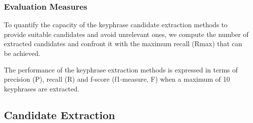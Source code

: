     \subsubsection{Evaluation Measures}
    \label{subsubsec:keyphrase_extraction_evaluation_measures}
      To quantify the capacity of the keyphrase candidate extraction methods to
      provide suitable candidates and avoid unrelevant ones, we compute the
      number of extracted candidates and confront it with the maximum recall
      (Rmax) that can be achieved.

      The performance of the keyphrase extraction methods is expressed in terms
      of precision (P), recall (R) and f-score (f1-measure, F) when a maximum of
      10 keyphrases are extracted.

  \subsection{Candidate Extraction}
  \label{subsec:candidate_extraction}
